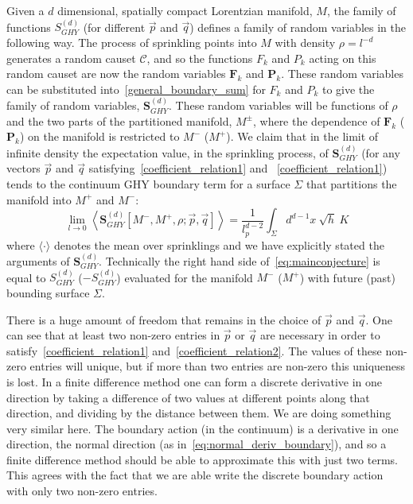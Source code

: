 \documentclass[12pt]{article}
\newcommand{\be}{\begin{equation}}
\newcommand{\ee}{\end{equation}}
\newcommand{\F}[1]{F_{#1}}
\renewcommand{\P}[1]{P_{#1}}
\newcommand{\BF}[1]{\mathbf{F}_{#1}}
\newcommand{\BP}[1]{\mathbf{P}_{#1}}
\begin{document}
Given a $d$ dimensional, spatially compact Lorentzian manifold, $M$, the family of functions $S^{ (d)}_{GHY}$ (for different $\vec{p}$ and $\vec{q}$) defines a family of random variables in the following way. The process of sprinkling points into $M$ with density $\rho=l^{-d}$ generates a random causet $\mathcal{C}$, and so the functions $\F{k}$ and $\P{k}$ acting on this random causet are now the random variables $\BF{k}$ and $\BP{k}$. These random variables can be substituted into~\eqref{general_boundary_sum} for $\F{k}$ and $\P{k}$ to give the family of random variables, $\textbf{S}^{ (d)}_{GHY}$. These random variables will be functions of $\rho$ and the two parts of the partitioned manifold, $M^{\pm}$, where the dependence of $\BF{k}$ ($\BP{k}$) on the manifold is restricted to $M^-$ ($M^+$). We claim that in the limit of infinite density the expectation value, in the sprinkling process, of $\textbf{S}^{ (d)}_{GHY}$ (for any vectors $\vec{p}$ and $\vec{q}$ satisfying~\eqref{coefficient_relation1} and ~\eqref{coefficient_relation1}) tends to the continuum GHY boundary term for a surface $\Sigma$ that partitions the manifold into $M^+$ and $M^-$:
\be
\lim_{l\rightarrow0}\left\langle\textbf{S}^{ (d)}_{GHY}[M^-,M^+,\rho;\vec{p} , \vec{q}]\right\rangle= \frac{1}{l_p^{d-2}}\int_{\Sigma} d^{d-1}x\: \sqrt{h}\: K\label{eq:mainconjecture}
\ee
where $\langle\cdot\rangle$ denotes the mean over sprinklings and we have explicitly stated the arguments of $\textbf{S}^{ (d)}_{GHY}$. Technically the right hand side of~\eqref{eq:mainconjecture} is equal to ${S}^{(d)}_{GHY}$ ($-{S}^{(d)}_{GHY}$) evaluated for the manifold $M^-$ ($M^+$) with future (past) bounding surface $\Sigma$.

There is a huge amount of freedom that remains in the choice of $\vec{p}$ and $\vec{q}$. One can see that at least two non-zero entries in $\vec{p}$ or $\vec{q}$ are necessary in order to satisfy~\eqref{coefficient_relation1} and~\eqref{coefficient_relation2}. The values of these non-zero entries will unique, but if more than two entries are non-zero this uniqueness is lost. In a finite difference method one can form a discrete derivative in one direction by taking a difference of two values at different points along that direction, and dividing by the distance between them. We are doing something very similar here. The boundary action (in the continuum) is a derivative in one direction, the normal direction (as in~\eqref{eq:normal_deriv_boundary}), and so a finite difference method should be able to approximate this with just two terms. This agrees with the fact that we are able write the discrete boundary action with only two non-zero entries.
\end{document}
